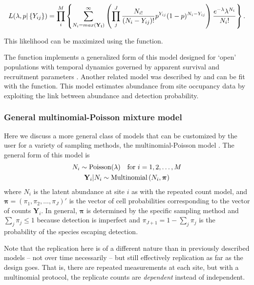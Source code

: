 \documentclass[article,shortnames]{jss}
\DeclareMathOperator{\Poi}{Poisson}
\DeclareMathOperator{\MN}{Multinomial}
\begin{document}
\begin{equation}
L(\lambda, p | \left\{Y_{ij}\right\}) = 
 \prod_{i}^{M} 
 \left\{ \sum_{N_{i}=max({\bf Y_i})}^{\infty}
          \left( \prod_{j}^{J} 
     \frac{N_{i!}}{ (N_{i}-Y_{ij})!} p^{Y_{ij}}(1-p)^{N_{i}-Y_{ij}} \right)
       \frac{e^{-\lambda} \lambda^{N_i}}{N_i!} \right\}.
\end{equation}

This likelihood can be maximized using the  function.  

The function  implements a generalized form of this model
designed for `open' populations with temporal dynamics governed by 
apparent survival and recruitment parameters \citep{DailMadsen2011}. Another
related model was described by \citet{Royle2003} and can be fit with the 
 function. This model estimates abundance from site occupancy 
data by exploiting the link between abundance and detection probability. 
     
\subsubsection{General multinomial-Poisson mixture model}

\label{sec:gener-mult-poiss}
Here we discuss a more general class of models that can be customized by the
user for a variety of sampling methods, the multinomial-Poisson model
\citep{Royle2004a}.   The general form of this model is
\begin{gather}
\label{eq:mp2}
  N_i \sim \Poi(\lambda) \text{\quad for $i=1,2,\dots,M$}  \notag \\
  \mathbf Y_i | N_{i} \sim \MN\left(N_i, \boldsymbol \pi \right) \notag
\end{gather}
where $N_i$ is the latent abundance at site $i$ as with the repeated
count model, and $\boldsymbol \pi=(\pi_1,\pi_2,\dots,\pi_J)'$ is
the vector of cell probabilities corresponding to the vector of counts 
$\mathbf Y_{i}$.  In general, $\boldsymbol \pi$ is
determined by the specific sampling method and
$\sum_{j} \pi_{j} \le 1$ because detection is imperfect and
$\pi_{J+1}=1 - \sum_{j} \pi_{j}$  is the probability of the species
escaping detection.  

Note that the replication here is of a different 
nature than in previously described models -- not over time necessarily -- 
but still effectively replication as far as the design goes. That is, 
there are repeated measurements at each site, but with a multinomial protocol, 
the replicate counts are {\it dependent} instead of independent. 
\end{document}
